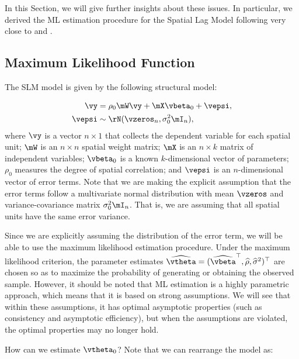 \documentclass[english,12pt]{book}\usepackage[]{graphicx}\usepackage[]{xcolor}
\begin{document}
In this Section, we will give further insights about these issues. In particular, we derived the ML estimation procedure for the Spatial Lag Model following very close to \cite{ord1975estimation} and \citet[][chapter 6]{anselin1988spatial}.

\subsection{Maximum Likelihood Function}

The SLM model is given by the following structural model:

\begin{equation}
  \begin{aligned}
    \vy     & = \rho_0 \mW\vy + \mX\vbeta_0 + \vepsi, \\
     \vepsi & \sim \rN(\vzeros_n , \sigma^2_0\mI_n),
  \end{aligned}
\end{equation}
%
where $\vy$ is a vector $n\times 1$ that collects the dependent variable for each spatial unit; $\mW$ is an $n\times n$ spatial weight matrix; $\mX$ is an $n \times k$ matrix of independent variables; $\vbeta_0$ is a known $k$-dimensional vector of parameters; $\rho_0$ measures the degree of spatial correlation; and $\vepsi$ is an $n$-dimensional vector of error terms. Note that we are making the explicit assumption that the error terms follow a multivariate normal distribution with mean $\vzeros$ and variance-covariance matrix $\sigma^2_0\mI_n$. That is, we are assuming that all spatial units have the same error variance. 

Since we are explicitly assuming the distribution of the error term, we will be able to use the maximum likelihood estimation procedure. Under the maximum likelihood criterion, the parameter estimates $\widehat{\vtheta} = (\widehat{\vbeta}^\top, \widehat{\rho}, \widehat{\sigma}^2)^\top$ are chosen so as to maximize the probability of generating or obtaining the observed sample.  However, it should be noted that ML estimation is a highly parametric approach, which means that it is based on strong assumptions. We will see that within these assumptions, it has optimal asymptotic properties (such as consistency and asymptotic efficiency), but when the assumptions are violated, the optimal properties may no longer hold. 

How can we estimate $\vtheta_0$? Note that we can rearrange the model as:
\end{document}
